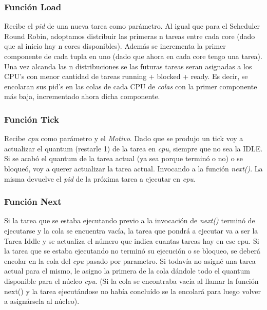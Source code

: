 \documentclass[a4paper]{article}
\begin{document}
\subsubsection*{Funci\'on Load}

Recibe el \emph{pid} de una nueva tarea como par\'ametro. Al igual que para el Scheduler Round Robin, adoptamos distribuir las primeras n tareas entre cada core (dado que al inicio hay n cores disponibles). Además se incrementa la primer componente de cada tupla en uno (dado que ahora en cada core tengo una tarea). Una vez alcanda las n distribuciones se las futuras tareas seran asignadas a los CPU's con menor cantidad de tareas running + blocked + ready.  Es decir, se encolaran sus pid's en las colas de cada CPU de \emph{colas} con la primer componente más baja, incrementado ahora dicha componente.

\subsubsection*{Funci\'on Tick}	

Recibe \emph{cpu} como par\'ametro y el \emph{Motivo}. Dado que se produjo un tick voy a actualizar el quantum (restarle 1) de la tarea en \emph{cpu}, siempre que no sea la IDLE. Si se acab\'o el quantum de la tarea actual (ya sea porque termin\'o o no) o se bloque\'o, voy a querer actualizar la tarea actual. Invocando a la funci\'on \emph{next()}. La misma devuelve el \emph{pid} de la próxima tarea a ejecutar en \emph{cpu}.

\subsubsection*{Funci\'on Next}	
	

Si la tarea que se estaba ejecutando previo a la invocaci\'on de \emph{next()} termin\'o de ejecutarse y la cola se encuentra vac\'ia, la tarea que pondr\'a a ejecutar va a ser la Tarea Iddle y se actualiza el número que indica cuantas tareas hay en ese cpu.
Si la tarea que se estaba ejecutando no termin\'o su ejecuci\'on o se bloqueo, se deber\'a encolar en la cola del \emph{cpu} pasado por parametro.
Si todav\'ia no asign\'e una tarea actual para el mismo, le asigno la primera de la cola d\'andole todo el quantum disponible para el n\'ucleo \emph{cpu}. (Si la cola se encontraba vac\'ia al llamar la funci\'on next() y la tarea ejecut\'andose no hab\'ia conclu\'ido se la encolar\'a para luego volver a asign\'arsela al n\'ucleo).\\
 
\end{document}
